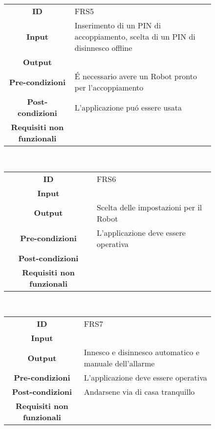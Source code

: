 \documentclass[]{article}
\begin{document}
\begin{figure}[htbp]
\centering
\begin{tabular}{|c|l|}
\hline
\textbf{ID}
 & 
FRS5
\\
\textbf{Input}
 & 
Inserimento di un PIN di accoppiamento, scelta di un PIN di disinnesco
offline
\\
\textbf{Output}
 & 

\\
\textbf{Pre-condizioni}
 & 
É necessario avere un Robot pronto per l'accoppiamento
\\
\textbf{Post-condizioni}
 & 
L'applicazione puó essere usata
\\
\textbf{Requisiti non funzionali}
 & 

\\
\hline
\end{tabular}
\end{figure}

~

\begin{figure}[htbp]
\centering
\begin{tabular}{|c|l|}
\hline
\textbf{ID} & FRS6\\
\textbf{Input} &\\
\textbf{Output} & Scelta delle impostazioni per il Robot\\
\textbf{Pre-condizioni} & L'applicazione deve essere
operativa\\
\textbf{Post-condizioni} &\\
\textbf{Requisiti non funzionali} &\\
\hline
\end{tabular}
\end{figure}

~

\begin{figure}[htbp]
\centering
\begin{tabular}{|c|l|}
\hline
\textbf{ID} & FRS7\\
\textbf{Input} &\\
\textbf{Output} & Innesco e disinnesco automatico e manuale
dell'allarme\\
\textbf{Pre-condizioni} & L'applicazione deve essere
operativa\\
\textbf{Post-condizioni} & Andarsene via di casa
tranquillo\\
\textbf{Requisiti non funzionali} &\\
\hline
\end{tabular}
\end{figure}
\end{document}
